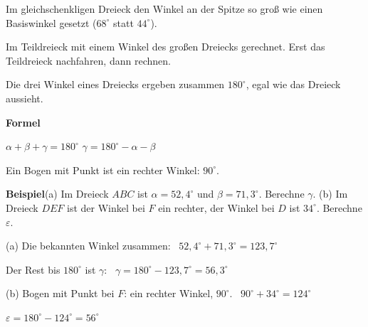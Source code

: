 \documentclass[11pt]{article}
\newcommand{\nr}[1]{\makebox[7mm][l]{\textbf{#1}}}
\begin{document}
\noindent\nr{$\times$}Im gleichschenkligen Dreieck den Winkel an der Spitze so groß wie einen Basiswinkel gesetzt ($68^\circ$ statt $44^\circ$).\par
\noindent\nr{$\times$}Im Teildreieck mit einem Winkel des großen Dreiecks gerechnet. Erst das Teildreieck nachfahren, dann rechnen.\par
\clearpage\label{s:A}\noindent\colorbox{black!12}{}\hspace{3mm}{\Large\bfseries Winkelsumme im Dreieck}\par\smallskip
\noindent Die drei Winkel eines Dreiecks ergeben zusammen $180^\circ$, egal wie das Dreieck aussieht.\par\medskip
\noindent\textbf{Formel}\par\nopagebreak\noindent\hspace*{4mm}\begin{minipage}{\dimexpr\linewidth-4mm\relax}$\alpha + \beta + \gamma = 180^\circ$ \qquad $\gamma = 180^\circ - \alpha - \beta$\par {\small Ein Bogen mit Punkt ist ein rechter Winkel: $90^\circ$.}\end{minipage}\par\medskip
\noindent\textbf{Beispiel}\quad (a) Im Dreieck $ABC$ ist $\alpha = 52{,}4^\circ$ und $\beta = 71{,}3^\circ$. Berechne $\gamma$. (b) Im Dreieck $DEF$ ist der Winkel bei $F$ ein rechter, der Winkel bei $D$ ist $34^\circ$. Berechne $\varepsilon$.\par\smallskip
\noindent\begin{minipage}[t]{0.6\linewidth}\vspace{0pt}\par\noindent{}(a) Die bekannten Winkel zusammen: \ $52{,}4^\circ + 71{,}3^\circ = 123{,}7^\circ$\par\smallskip\par\noindent{}Der Rest bis $180^\circ$ ist $\gamma$: \ $\gamma = 180^\circ - 123{,}7^\circ = 56{,}3^\circ$\par\smallskip\par\noindent{}(b) Bogen mit Punkt bei $F$: ein rechter Winkel, $90^\circ$. \ $90^\circ + 34^\circ = 124^\circ$\par\smallskip\par\noindent{}$\varepsilon = 180^\circ - 124^\circ = 56^\circ$\par\smallskip\end{minipage}\hfill
\end{document}
